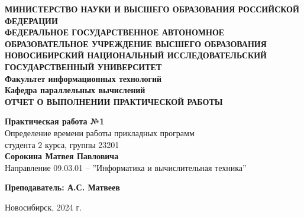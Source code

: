 \documentclass[12pt,a4paper]{article}
\numberwithin{subsection}{section}
\begin{document}
\begin{titlepage}
    \begin{center}
        \vspace*{2cm}
        {\Large \textbf{МИНИСТЕРСТВО НАУКИ И ВЫСШЕГО ОБРАЗОВАНИЯ РОССИЙСКОЙ ФЕДЕРАЦИИ}}\\
        \vspace{0.5cm}
        {\Large \textbf{ФЕДЕРАЛЬНОЕ ГОСУДАРСТВЕННОЕ АВТОНОМНОЕ ОБРАЗОВАТЕЛЬНОЕ УЧРЕЖДЕНИЕ ВЫСШЕГО ОБРАЗОВАНИЯ}}\\
        \vspace{0.5cm}
        {\Large \textbf{НОВОСИБИРСКИЙ НАЦИОНАЛЬНЫЙ ИССЛЕДОВАТЕЛЬСКИЙ ГОСУДАРСТВЕННЫЙ УНИВЕРСИТЕТ}}\\
        \vspace{0.5cm}
        {\large \textbf{Факультет информационных технологий}}\\
        \vspace{0.5cm}
        {\large \textbf{Кафедра параллельных вычислений}}\\
        \vspace{1cm}
         {\Large \textbf{ОТЧЕТ О ВЫПОЛНЕНИИ ПРАКТИЧЕСКОЙ РАБОТЫ}}
        \vspace{0.5cm}
        
        {\Large \textbf{Практическая работа №1}}\\
        \vspace{0.5cm}
         {\large Определение времени работы прикладных программ}\\
        \vspace{0.5cm}
        {\large студента 2 курса, группы 23201}\\
        \vspace{0.5cm}
        {\Large \textbf{Сорокина Матвея Павловича}}\\
        \vspace{1cm}
        {\large Направление 09.03.01 -- ''Информатика и вычислительная техника''}\\
        \vspace{2cm}
        
        \begin{flushright}
            \textbf{Преподаватель: А.С. Матвеев} \\
        \end{flushright}
        
        \vfill
        
        {\large Новосибирск, 2024 г.}
    \end{center}
\end{titlepage}
\end{document}
